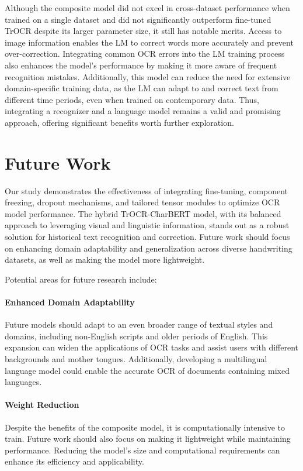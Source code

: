 Although the composite model did not excel in cross-dataset performance when trained on a single dataset and did not significantly outperform fine-tuned TrOCR despite its larger parameter size, it still has notable merits. Access to image information enables the LM to correct words more accurately and prevent over-correction. Integrating common OCR errors into the LM training process also enhances the model's performance by making it more aware of frequent recognition mistakes. Additionally, this model can reduce the need for extensive domain-specific training data, as the LM can adapt to and correct text from different time periods, even when trained on contemporary data. Thus, integrating a recognizer and a language model remains a valid and promising approach, offering significant benefits worth further exploration.
\section{Future Work}
Our study demonstrates the effectiveness of integrating fine-tuning, component freezing, dropout mechanisms, and tailored tensor modules to optimize OCR model performance. The hybrid TrOCR-CharBERT model, with its balanced approach to leveraging visual and linguistic information, stands out as a robust solution for historical text recognition and correction. Future work should focus on enhancing domain adaptability and generalization across diverse handwriting datasets, as well as making the model more lightweight.

Potential areas for future research include:

\paragraph*{Enhanced Domain Adaptability}
Future models should adapt to an even broader range of textual styles and domains, including non-English scripts and older periods of English. This expansion can widen the applications of OCR tasks and assist users with different backgrounds and mother tongues. Additionally, developing a multilingual language model could enable the accurate OCR of documents containing mixed languages.

\paragraph*{Weight Reduction}
Despite the benefits of the composite model, it is computationally intensive to train. Future work should also focus on making it lightweight while maintaining performance. Reducing the model's size and computational requirements can enhance its efficiency and applicability.

